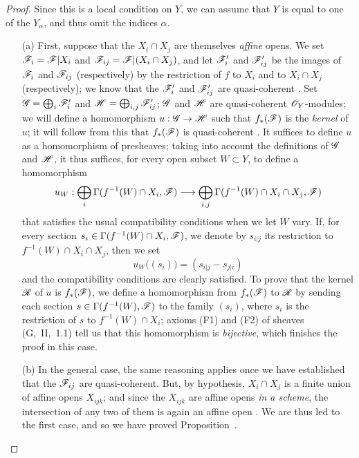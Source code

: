 \begin{proof}
Since this is a local condition on $Y$, we can assume that $Y$ is equal to one
of the $Y_\alpha$, and thus omit the indices $\alpha$.
\begin{enumerate}
  \item[(a)] First, suppose that the $X_i\cap X_j$
    are themselves \emph{affine} opens. We set $\mathscr{F}_i=\mathscr{F}|X_i$ and
    $\mathscr{F}_{ij}=\mathscr{F}|(X_i\cap X_j)$, and let $\mathscr{F}'_i$ and
    $\mathscr{F}'_{ij}$ be the images of $\mathscr{F}_i$ and $\mathscr{F}_{ij}$
    (respectively) by the restriction of $f$ to $X_i$ and to $X_i\cap X_j$
    (respectively); we know that the $\mathscr{F}'_i$ and $\mathscr{F}'_{ij}$ are
    quasi-coherent . Set $\mathscr{G}=\bigoplus_i\mathscr{F}'_i$ and
    $\mathscr{H}=\bigoplus_{i,j}\mathscr{F}'_{ij}$; $\mathscr{G}$ and $\mathscr{H}$ are
    quasi-coherent $\mathscr{O}_Y$-modules; we will define a homomorphism
    $u:\sh{G}\to\sh{H}$ such that $f_*(\mathscr{F})$ is the
    \emph{kernel} of $u$; it will follow from this that $f_*(\mathscr{F})$ is
    quasi-coherent . It suffices to define $u$ as
    a homomorphism of presheaves; taking into account the definitions of $\mathscr{G}$
    and $\mathscr{H}$, it thus suffices, for every open subset $W\subset Y$, to define a
    homomorphism
    \[
      u_W:\bigoplus_i\Gamma(f^{-1}(W)\cap X_i,\sh{F})\to\bigoplus_{i,j}\Gamma(f^{-1}(W)\cap X_i\cap X_j,\sh{F})
    \]
    that satisfies the usual compatibility conditions when we let $W$ vary.
    If, for every section $s_i\in\Gamma(f^{-1}(W)\cap X_i,\mathscr{F})$, we denote by $s_{i|j}$ its restriction to $f^{-1}(W)\cap X_i\cap X_j$, then we set
    \[
      u_W\big((s_i)\big)=(s_{i|j}-s_{j|i})
    \]
    and the compatibility conditions are clearly satisfied.
    To prove that the kernel $\mathscr{R}$ of $u$ is $f_*(\mathscr{F})$, we define a homomorphism from $f_*(\mathscr{F})$ to $\mathscr{R}$ by sending each section $s\in\Gamma(f^{-1}(W),\mathscr{F})$ to the family $(s_i)$, where $s_i$ is the restriction of $s$ to $f^{-1}(W)\cap X_i$; axioms (F1) and (F2) of sheaves (G,~II,~1.1) tell us that this homomorphism is \emph{bijective}, which finishes the proof in this case.
  \item[(b)] In the general case, the same reasoning applies once we have established that the $\mathscr{F}_{ij}$ are quasi-coherent.
    But, by hypothesis, $X_i\cap X_j$ is a finite union of affine opens $X_{ijk}$; and since the $X_{ijk}$ are affine opens \emph{in a scheme}, the intersection of any two of them is again an affine open . We are thus led to the first case, and so we have proved Proposition~.
\end{enumerate}
\end{proof}

